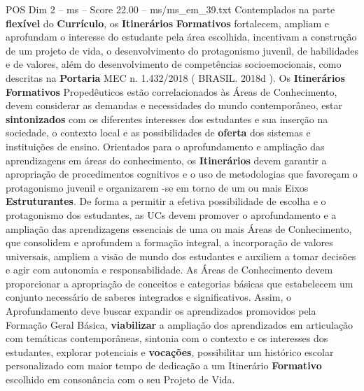 \begin{textsample}{POS Dim 2 – ms – Score 22.00 – ms/ms\_em\_39.txt}
Contemplados na parte \textbf{flexível} do \textbf{Currículo}, os \textbf{Itinerários} \textbf{Formativos} fortalecem, ampliam e aprofundam o interesse do estudante pela área escolhida, incentivam a construção de um projeto de vida, o desenvolvimento do protagonismo juvenil, de habilidades e de valores, além do desenvolvimento de competências socioemocionais, como descritas na \textbf{Portaria} MEC n. 1.432/2018 ( BRASIL. 2018d ).
Os \textbf{Itinerários} \textbf{Formativos} Propedêuticos estão correlacionados às Áreas de Conhecimento, devem considerar as demandas e necessidades do mundo contemporâneo, estar \textbf{sintonizados} com os diferentes interesses dos estudantes e sua inserção na sociedade, o contexto local e as possibilidades de \textbf{oferta} dos sistemas e instituições de ensino.
Orientados para o aprofundamento e ampliação das aprendizagens em áreas do conhecimento, os \textbf{Itinerários} devem garantir a apropriação de procedimentos cognitivos e o uso de metodologias que favoreçam o protagonismo juvenil e organizarem -se em torno de um ou mais Eixos \textbf{Estruturantes}.
De forma a permitir a efetiva possibilidade de escolha e o protagonismo dos estudantes, as UCs devem promover o aprofundamento e a ampliação das aprendizagens essenciais de uma ou mais Áreas de Conhecimento, que consolidem e aprofundem a formação integral, a incorporação de valores universais, ampliem a visão de mundo dos estudantes e auxiliem a tomar decisões e agir com autonomia e responsabilidade.
As Áreas de Conhecimento devem proporcionar a apropriação de conceitos e categorias básicas que estabelecem um conjunto necessário de saberes integrados e significativos.
Assim, o Aprofundamento deve buscar expandir os aprendizados promovidos pela Formação Geral Básica, \textbf{viabilizar} a ampliação dos aprendizados em articulação com temáticas contemporâneas, sintonia com o contexto e os interesses dos estudantes, explorar potenciais e \textbf{vocações}, possibilitar um histórico escolar personalizado com maior tempo de dedicação a um Itinerário \textbf{Formativo} escolhido em consonância com o seu Projeto de Vida.

\end{textsample}
